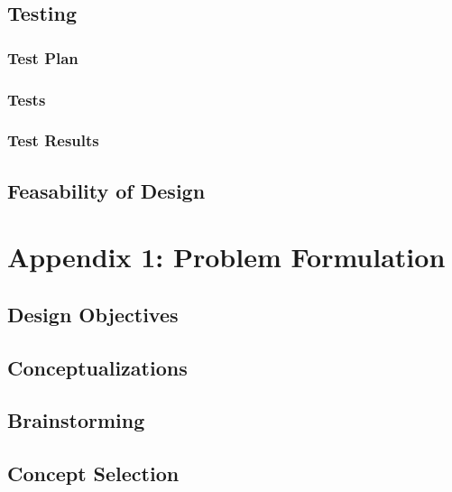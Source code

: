 \documentclass{article}
\begin{document}
\subsection{Testing}
\subsubsection{Test Plan}


\pagebreak

\subsubsection{Tests}


\subsubsection{Test Results}


\subsection{Feasability of Design} %



\newpage
\appendix
\appendixpage

\section{Appendix 1: Problem Formulation}
\subsection{Design Objectives}


\subsection{Conceptualizations}

\subsection{Brainstorming}

\subsection{Concept Selection}

\pagebreak
\end{document}
